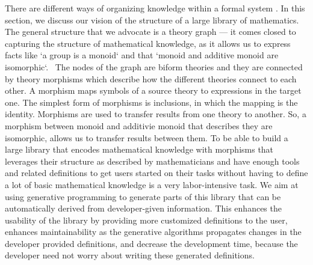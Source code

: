 There are different ways of organizing knowledge within a formal system . In this section, we discuss our vision of the structure of a large library of mathematics. The general structure that we advocate is a theory graph  --- it comes closed to capturing the structure of mathematical knowledge, as it allows us to express facts like `a group is a monoid` and that `monoid and additive monoid are isomorphic`. 
The nodes of the graph are biform theories  and they are connected by theory morphisms which describe how the different theories connect to each other. A morphism maps symbols of a source theory to expressions in the target one. The simplest form of morphisms is inclusions, in which the mapping is the identity. Morphisms are used to transfer results from one theory to another. So, a morphism between monoid and additivie monoid that describes they are isomorphic, allows us to transfer results between them. To be able to build a large library that encodes mathematical knowledge with morphisms that leverages their structure as described by mathematicians and have enough tools and related definitions to get users started on their tasks without having to define a lot of basic mathematical knowledge is a very labor-intensive task. We aim at using generative programming to generate parts of this library that can be automatically derived from developer-given information. This enhances the usability of the library by providing more customized definitions to the user, enhances maintainability as the generative algorithms propagates changes in the developer provided definitions, and decrease the development time, because the developer need not worry about writing these generated definitions. 




